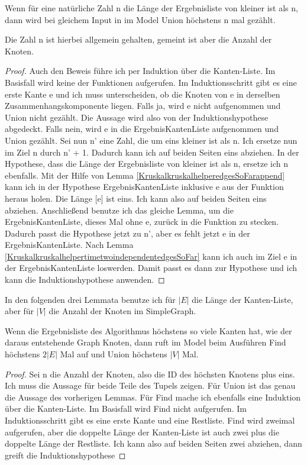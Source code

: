 \begin{lemma}[\Kruskalkruskalhelpertimetworight]
  Wenn für eine natürliche Zahl n die Länge der Ergebnisliste von \Kruskalkruskalhelper kleiner ist als n,
  dann wird bei gleichem Input in \Kruskalkruskalhelperprog im Model \Kruskalkruskalmodeltwo Union höchstens n mal gezählt.

  Die Zahl n ist hierbei allgemein gehalten, gemeint ist aber die Anzahl der Knoten.
\end{lemma}
\begin{proof}
  Auch den Beweis führe ich per Induktion über die Kanten-Liste.
  Im Basisfall wird keine der Funktionen aufgerufen.
  Im Induktionsschritt gibt es eine erste Kante e und ich muss unterscheiden, ob die Knoten von e in derselben Zusammenhangskomponente liegen.
  Falls ja, wird e nicht aufgenommen und Union nicht gezählt.
  Die Aussage wird also von der Induktionshypothese abgedeckt.
  Falls nein, wird e in die ErgebnisKantenListe aufgenommen und Union gezählt.
  Sei nun n' eine Zahl, die um eins kleiner ist als n.
  Ich ersetze nun im Ziel n durch n' + 1.
  Dadurch kann ich auf beiden Seiten eins abziehen.
  In der Hypothese, dass die Länge der Ergebnisliste von \Kruskalkruskalhelper kleiner ist als n, ersetze ich n ebenfalls.
  Mit der Hilfe von Lemma \ref{KruskalkruskalhelperedgesSoFarappend} kann ich in der Hypothese ErgebnisKantenListe inklusive e aus der Funktion heraus holen.
  Die Länge [e] ist eins.
  Ich kann also auf beiden Seiten eins abziehen.
  Anschließend benutze ich das gleiche Lemma, um die ErgebnisKantenListe, dieses Mal ohne e, zurück in die Funktion zu stecken.
  Dadurch passt die Hypothese jetzt zu n', aber es fehlt jetzt e in der ErgebnisKantenListe.
  Nach Lemma \ref{KruskalkruskalhelpertimetwoindependentedgesSoFar} kann ich auch im Ziel e in der ErgebnisKantenListe loswerden.
  Damit passt es dann zur Hypothese und ich kann die Induktionshypothese anwenden.
\end{proof}

In den folgenden drei Lemmata benutze ich für $|E|$ die Länge der Kanten-Liste, aber für $|V|$ die Anzahl der Knoten im SimpleGraph.

\begin{lemma}[\Kruskalkruskalhelpertimetwo]\label{Kruskalkruskalhelpertimetwo}
  Wenn die Ergebnisliste des Algorithmus höchstens so viele Kanten hat, wie der daraus entstehende Graph Knoten, 
  dann ruft \Kruskalkruskalhelperprog im Model \Kruskalkruskalmodeltwo beim Ausführen Find höchstens $2|E|$ Mal auf und Union höchstens $|V|$ Mal.
\end{lemma}
\begin{proof}
  Sei n die Anzahl der Knoten, also die ID des höchsten Knotens plus eins.
  Ich muss die Aussage für beide Teile des Tupels zeigen.
  Für Union ist das genau die Aussage des vorherigen Lemmas.
  Für Find mache ich ebenfalls eine Induktion über die Kanten-Liste.
  Im Basisfall wird Find nicht aufgerufen.
  Im Induktionsschritt gibt es eine erste Kante und eine Restliste.
  Find wird zweimal aufgerufen, aber die doppelte Länge der Kanten-Liste ist auch zwei plus die doppelte Länge der Restliste.
  Ich kann also auf beiden Seiten zwei abziehen, dann greift die Induktionshypothese
\end{proof}

